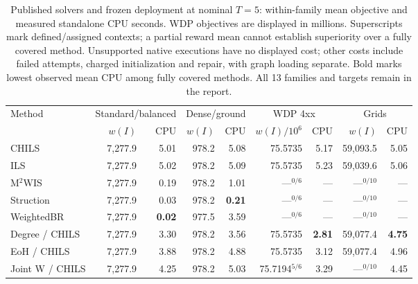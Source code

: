 \begin{table}[!t]
\centering
\small
\setlength{\tabcolsep}{3pt}
\caption{Published solvers and frozen deployment at nominal $T=5$: within-family mean objective and measured standalone CPU seconds. WDP objectives are displayed in millions. Superscripts mark defined/assigned contexts; a partial reward mean cannot establish superiority over a fully covered method. Unsupported native executions have no displayed cost; other costs include failed attempts, charged initialization and repair, with graph loading separate. Bold marks lowest observed mean CPU among fully covered methods. All 13 families and targets remain in the report.}
\label{tab:v06-published}
\begin{tabular}{lrrrrrrrr}
\toprule
Method & \multicolumn{2}{c}{Standard/balanced} & \multicolumn{2}{c}{Dense/ground} & \multicolumn{2}{c}{WDP 4xx} & \multicolumn{2}{c}{Grids}\\
 & $w(I)$ & CPU & $w(I)$ & CPU & $w(I)/10^6$ & CPU & $w(I)$ & CPU\\
\midrule
CHILS~\cite{grossmann2025chils} & 7,277.9 & 5.01 & 978.2 & 5.08 & 75.5735 & 5.17 & 59,093.5 & 5.05\\
ILS~\cite{grossmann2025chils} & 7,277.9 & 5.02 & 978.2 & 5.09 & 75.5735 & 5.23 & 59,039.6 & 5.06\\
M$^2$WIS~\cite{grossmann2024mmwis} & 7,277.9 & 0.19 & 978.2 & 1.01 & ---$^{0/6}$ & --- & ---$^{0/10}$ & ---\\
Struction~\cite{gellner2021struction} & 7,277.9 & 0.03 & 978.2 & \textbf{0.21} & ---$^{0/6}$ & --- & ---$^{0/10}$ & ---\\
WeightedBR~\cite{lamm2019weighted} & 7,277.9 & \textbf{0.02} & 977.5 & 3.59 & ---$^{0/6}$ & --- & ---$^{0/10}$ & ---\\
Degree / CHILS & 7,277.9 & 3.30 & 978.2 & 3.56 & 75.5735 & \textbf{2.81} & 59,077.4 & \textbf{4.75}\\
EoH / CHILS~\cite{liu2024eoh} & 7,277.9 & 3.88 & 978.2 & 4.88 & 75.5735 & 3.12 & 59,077.4 & 4.96\\
Joint W / CHILS & 7,277.9 & 4.25 & 978.2 & 5.03 & 75.7194$^{5/6}$ & 3.29 & ---$^{0/10}$ & 4.45\\
\bottomrule
\end{tabular}
\end{table}
